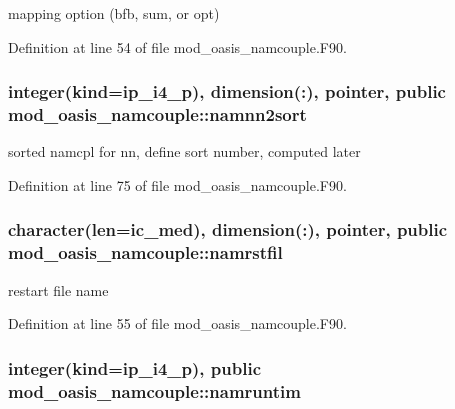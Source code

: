 mapping option (bfb, sum, or opt) 



Definition at line 54 of file mod\+\_\+oasis\+\_\+namcouple.\+F90.

\hypertarget{classmod__oasis__namcouple_a0ace7c451d8658759b9c8d871926a76e}{
\subsubsection[{namnn2sort}]{\setlength{\rightskip}{0pt plus 5cm}integer(kind=ip\+\_\+i4\+\_\+p), dimension(\+:), pointer, public mod\+\_\+oasis\+\_\+namcouple\+::namnn2sort}}\label{classmod__oasis__namcouple_a0ace7c451d8658759b9c8d871926a76e}


sorted namcpl for nn, define sort number, computed later 



Definition at line 75 of file mod\+\_\+oasis\+\_\+namcouple.\+F90.

\hypertarget{classmod__oasis__namcouple_a54f4b8262f809a20928092782bc78345}{
\subsubsection[{namrstfil}]{\setlength{\rightskip}{0pt plus 5cm}character(len=ic\+\_\+med), dimension(\+:), pointer, public mod\+\_\+oasis\+\_\+namcouple\+::namrstfil}}\label{classmod__oasis__namcouple_a54f4b8262f809a20928092782bc78345}


restart file name 



Definition at line 55 of file mod\+\_\+oasis\+\_\+namcouple.\+F90.

\hypertarget{classmod__oasis__namcouple_a14505eaa91b2c8ba308c63ff78652206}{
\subsubsection[{namruntim}]{\setlength{\rightskip}{0pt plus 5cm}integer(kind=ip\+\_\+i4\+\_\+p), public mod\+\_\+oasis\+\_\+namcouple\+::namruntim}}\label{classmod__oasis__namcouple_a14505eaa91b2c8ba308c63ff78652206}


